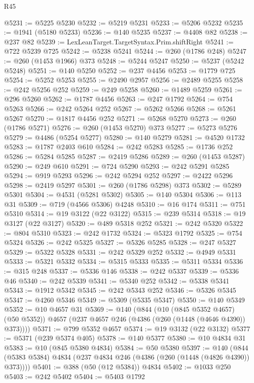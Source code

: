 \begin{lexlean}{R45}
\begin{coremodule}
{@5231 := @5225 @5230
@5232 := @5219 @5231
@5233 := @5206 @5232
@5235 := @1941 (@5180 @5233)
@5236 := @140 @5235
@5237 := @4408 @82
@5238 := @237 @82
@5239 := LexLeanTarget.TargetSyntax.Prim.shiftRight
@5241 := @722 @5239 @725
@5242 := @5238 @5241
@5244 := @260 (@1786 @248)
@5247 := @260 (@1453 @1966) @373
@5248 := @5244 @5247
@5250 := @5237 (@5242 @5248)
@5251 := @140 @5250
@5252 := @237 @4456
@5253 := @1779 @725
@5254 := @5252 @5253
@5255 := @2490 @2957
@5256 := @2489 @5255
@5258 := @242 @5256 @252
@5259 := @249 @5258
@5260 := @1489 @5259
@5261 := @296 @5260
@5262 := @1787 @4456
@5263 := @247 @1792
@5264 := @754 @5263
@5266 := @242 @5264 @252
@5267 := @5262 @5266
@5268 := @5261 @5267
@5270 := @1817 @4456 @252
@5271 := @5268 @5270
@5273 := @260 (@1786 @5271)
@5276 := @260 (@1453 @5270) @373
@5277 := @5273 @5276
@5279 := @4486 (@5254 @5277)
@5280 := @140 @5279
@5281 := @4520 @1732
@5283 := @1787 @2403 @610
@5284 := @242 @5283
@5285 := @1736 @252
@5286 := @5284 @5285
@5287 := @2419 @5286
@5289 := @260 (@1453 @5287)
@5290 := @249 @610
@5291 := @724 @5290
@5293 := @242 @5291 @5285
@5294 := @919 @5293
@5296 := @242 @5294 @252
@5297 := @2422 @5296
@5298 := @2419 @5297
@5301 := @260 (@1786 @5298) @373
@5302 := @5289 @5301
@5304 := @4531 (@5281 @5302)
@5305 := @140 @5304
@5306 := @113 @31
@5309 := @719 (@4566 @5306) @4248
@5310 := @16 @174
@5311 := @751 @5310
@5314 := @19 @3122 (@22 @3122)
@5315 := @239 @5314
@5318 := @19 @3127 (@22 @3127)
@5320 := @489 @5318 @252
@5321 := @242 @5320
@5322 := @804 @5310
@5323 := @242 @1732
@5324 := @5323 @1792
@5325 := @754 @5324
@5326 := @242 @5325
@5327 := @5326 @5285
@5328 := @247 @5327
@5329 := @5322 @5328
@5331 := @242 @5329 @252
@5332 := @4949 @5331
@5333 := @5321 @5332
@5334 := @5315 @5333
@5335 := @5311 @5334
@5336 := @315 @248
@5337 := @5336 @146
@5338 := @242 @5337
@5339 := @5336 @46
@5340 := @242 @5339
@5341 := @5340 @252
@5342 := @5338 @5341
@5343 := @1912 @5342
@5345 := @242 @5343 @252
@5346 := @5326 @5345
@5347 := @4260 @5346
@5349 := @5309 (@5335 @5347)
@5350 := @140 @5349
@5352 := @10 @4657 @31
@5369 := @140
    (@844
      (@10 (@845 @5352 @4657) (@50 @5352))
      @4657
      (@237 @4657 @246 (@4386 (@260 (@1448 (@4646 @4390)) @373))))
@5371 := @799 @5352 @4657
@5374 := @19 @3132 (@22 @3132)
@5377 := @5371 (@239 @5374 @405)
@5378 := @140 @5377
@5380 := @10 @4834 @31
@5383 := @10 (@845 @5380 @4834)
@5384 := @50 @5380
@5397 := @140 (@844 (@5383 @5384) @4834 (@237 @4834 @246 (@4386 (@260 (@1448 (@4826 @4390)) @373))))
@5401 := @388 (@50 (@12 @5384)) @4834
@5402 := @1033 @250
@5403 := @242 @5402
@5404 := @5403 @1792
}
\end{coremodule}
\end{lexlean}
